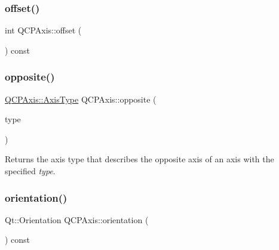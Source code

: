 \mbox{\label{class_q_c_p_axis_aef66fa16353b4993b1cceabfb644a1a9}} 
\subsubsection{\texorpdfstring{offset()}{offset()}}
{\footnotesize\ttfamily int Q\+C\+P\+Axis\+::offset (\begin{DoxyParamCaption}{ }\end{DoxyParamCaption}) const}

\mbox{\label{class_q_c_p_axis_aa85ba73dfee6483e23825461b725e363}} 
\subsubsection{\texorpdfstring{opposite()}{opposite()}}
{\footnotesize\ttfamily \hyperlink{class_q_c_p_axis_ae2bcc1728b382f10f064612b368bc18a}{Q\+C\+P\+Axis\+::\+Axis\+Type} Q\+C\+P\+Axis\+::opposite (\begin{DoxyParamCaption}\item[{\hyperlink{class_q_c_p_axis_ae2bcc1728b382f10f064612b368bc18a}{Q\+C\+P\+Axis\+::\+Axis\+Type}}]{type }\end{DoxyParamCaption})\hspace{0.3cm}{\ttfamily [static]}}

Returns the axis type that describes the opposite axis of an axis with the specified {\itshape type}. \mbox{\label{class_q_c_p_axis_ab988ef4538e2655bb77bd138189cd42e}} 
\subsubsection{\texorpdfstring{orientation()}{orientation()}\hspace{0.1cm}{\footnotesize\ttfamily [1/2]}}
{\footnotesize\ttfamily Qt\+::\+Orientation Q\+C\+P\+Axis\+::orientation (\begin{DoxyParamCaption}{ }\end{DoxyParamCaption}) const\hspace{0.3cm}{\ttfamily [inline]}}

